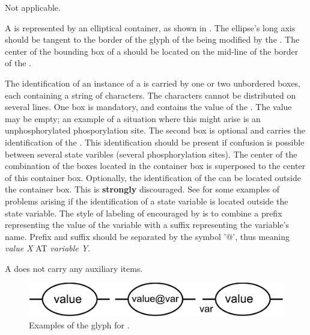 \begin{glyphDescription}

\glyphSboTerm Not applicable.

\glyphContainer A  is represented by an elliptical container, as shown in .  The ellipse's long axis should be tangent to the border of the glyph of the  being modified by the . The center of the bounding box of a  should be located on the mid-line of the border of the .

\glyphLabel The identification of an instance of a  is carried by one or two unbordered boxes, each containing a string of characters.  The characters cannot be distributed on several lines.  One box is mandatory, and contains the value of the .  The value may be empty; an example of a situation where this might arise is an unphosphorylated phosporylation site.  The second box is optional and carries the identification of the .  This identification should be present if confusion is possible between several state varibles (\eg several phosphorylation sites).  The center of the combination of the boxes located in the container box is superposed to the center of this container box.  Optionally, the identification of the  can be located outside the  container box.  This is \textbf{strongly} discouraged.  See  for some examples of problems arising if the identification of a state variable is located outside the state variable.  The style of labeling of  encouraged by \SBGNPDLone is to combine a prefix representing the value of the variable with a suffix representing the variable's name.  Prefix and suffix should be separated by the symbol '@', thus meaning \emph{value X} AT \emph{variable Y}.

\glyphAux A  does not carry any auxiliary items.  

\end{glyphDescription}

\begin{figure}[H]
  \centering
  \includegraphics[scale = 0.3, trim = 0 0 0 0.25in]{images/stateVariable}
  \caption{Examples of the \PD glyph for .}
  \label{fig:state-var}
\end{figure}

